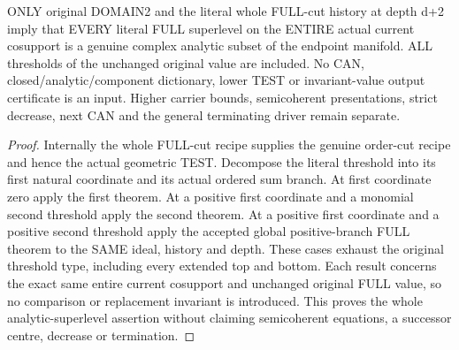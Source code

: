 \begin{theorem}
\label{hir:original-full-cut-all-global-superlevels-analytic}
\leanok
ONLY original DOMAIN2 and the literal whole FULL-cut history at depth d+2
imply that EVERY literal FULL superlevel on the ENTIRE actual current
cosupport is a genuine complex analytic subset of the endpoint manifold.
ALL thresholds of the unchanged original value are included. No CAN,
closed/analytic/component dictionary, lower TEST or invariant-value output
certificate is an input. Higher carrier bounds, semicoherent presentations,
strict decrease, next CAN and the general terminating driver remain separate.
\end{theorem}
\begin{proof}
Internally the whole FULL-cut recipe supplies the genuine order-cut recipe
and hence the actual geometric TEST. Decompose the literal threshold into
its first natural coordinate and its actual ordered sum branch. At first
coordinate zero apply the first theorem. At a positive first coordinate and
a monomial second threshold apply the second theorem. At a positive first
coordinate and a positive second threshold apply the accepted global
positive-branch FULL theorem to the SAME ideal, history and depth. These
cases exhaust the original threshold type, including every extended top and
bottom. Each result concerns the exact same entire current cosupport and
unchanged original FULL value, so no comparison or replacement invariant is
introduced. This proves the whole analytic-superlevel assertion without
claiming semicoherent equations, a successor centre, decrease or termination.
\end{proof}

